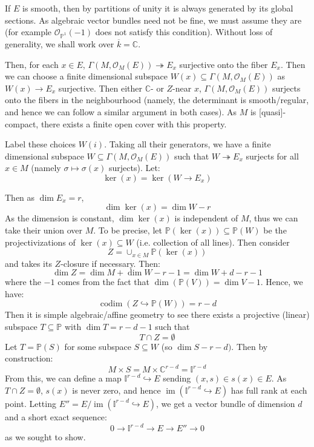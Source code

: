 \documentclass{book}
\newenvironment{Proof}[1][]
  {\begin{ProofTcb}[#1]}
  {\end{ProofTcb}}
\newcommand{\BI}{{\mathbb{I}}}
\newcommand{\C}{{\mathbb{C}}}
\renewcommand{\P}{{\mathbb{P}}}
\newcommand{\CO}{{\mathcal{O}}}
\newcommand{\sse}{\subseteq}
\newcommand{\im}{{\operatorname{im}}}
\newcommand{\codim}{{\operatorname{codim}}}
\begin{document}
\begin{Proof}
  If $E$ is smooth, then by partitions of unity it is always generated by its global sections. As algebraic
  vector bundles need not be fine, we must assume they are (for example $\CO_{\P^1}(-1)$ does not satisfy this
  condition). Without loss of generality, we shall work over $\overline{k} = \C$.

  Then, for each $x \in E$, $\Gamma(M, \CO_M(E)) \twoheadrightarrow E_x$ surjective onto the fiber $E_x$. Then
  we can choose a finite dimensional subspace $W(x) \sse \Gamma(M, \CO_M(E))$ as $W(x) \to E_x$ surjective. Then
  either $\C$- or $Z$-near $x$, $\Gamma(M, \CO_M(E))$ surjects onto the fibers in the neighbourhood (namely,
  the determinant is smooth/regular, and hence we can follow a similar argument in both cases). As $M$ is
  [quasi]-compact, there exists a finite open cover with this property.

  Label these choices $W(i)$. Taking all their generators, we have a finite dimensional subspace $W \sse
  \Gamma(M, \CO_M(E))$ such that $W \twoheadrightarrow E_x$ surjects for all $ x\in M$ (namely $\sigma \mapsto
  \sigma(x)$ surjects). Let:
  \[
    \ker(x) = \ker(W \to E_x)
  \]

  Then as $\dim E_x = r$,
  \[
    \dim \ker(x) = \dim W - r
  \]
  As the dimension is constant, $\dim\ker(x)$ is independent of $M$, thus we can take their union over $M$. To
  be precise, let $\P(\ker(x))\sse \P(W)$ be the projectivizations of $\ker(x) \sse W$ (i.e. collection of all
  lines). Then consider
  \[
    Z = \cup_{x \in M} \P(\ker(x))
  \]
  and takes its $Z$-closure if necessary. Then:
  \[
    \dim Z = \dim M + \dim W - r-1 = \dim W  + d-r-1
  \]
  where the $-1$ comes from the fact that $\dim(\P(V))  = \dim V - 1$. Hence, we have:
  \[
    \codim(Z \hookrightarrow \P(W)) = r-d
  \]
  Then it is simple algebraic/affine geometry to see there exists a projective (linear) subspace $T \sse \P$ with $\dim
  T = r-d-1$ such that
  \[
    T\cap Z = \emptyset
  \]
  Let $T = \P(S)$ for some subspace $S \sse W$ (so $\dim S - r-d)$. Then by construction:
  \[
    M\times S = M \times \C^{r-d} = \BI^{r-d}
  \]
  From this, we can define a map $\BI^{r-d} \hookrightarrow E$ sending $(x,s) \in s(x) \in E$. As $T\cap
  Z  = \emptyset$, $s(x)$ is never zero, and hence $\im(\BI^{r-d} \hookrightarrow E)$ has full rank at each
  point. Letting $E'' = E/\im(\BI^{r-d} \hookrightarrow E)$, we get a vector bundle of dimension $d$
  and a short exact sequence:
  \[
    0 \to \BI^{r-d} \to E \to E'' \to 0
  \]
  as we sought to show.
\end{Proof}
\end{document}
